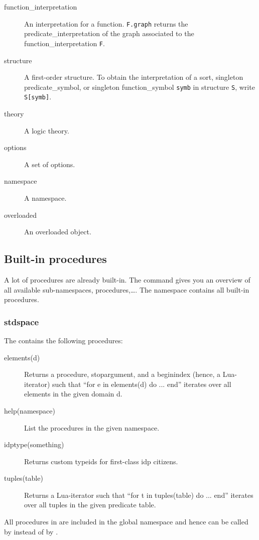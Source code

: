 \begin{description}
	\item[function\_interpretation] An interpretation for a function. {\tt F.graph} returns the predicate\_interpretation of the graph associated to the function\_interpretation {\tt F}. %
	\item[structure] A first-order structure. To obtain the interpretation of a sort, singleton predicate\_symbol, or singleton function\_symbol {\tt symb} in structure {\tt S}, write {\tt S[symb]}.
	\item[theory] A logic theory.
	\item[options] A set of options.
	\item[namespace] A namespace.
	\item[overloaded] An overloaded object.
\end{description}


\subsection{Built-in procedures}

A lot of procedures are already built-in. The command  gives you an overview of all available sub-namespaces, procedures,\ldots. The  namespace contains all built-in procedures.
\subsubsection{stdspace}
The  contains the following procedures:
\begin{description}
\item[elements(d)]
	Returns a procedure, stopargument, and a beginindex (hence, a Lua-iterator) such that
	``for e in elements(d) do ... end'' 
	iterates over all elements in the given domain d.
\item[help(namespace)]
	List the procedures in the given namespace.
\item[idptype(something)]
	Returns custom typeids for first-class idp citizens.
\item[tuples(table)]
	Returns a Lua-iterator such that
	``for t in tuples(table) do ... end''
	iterates over all tuples in the given predicate table.
\end{description}
All procedures in  are included in the global namespace and hence can be called by  instead of by .

